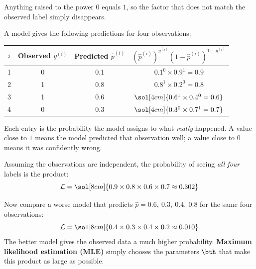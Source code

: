 \documentclass[12pt, a4paper]{article}
\begin{document}
Anything raised to the power $0$ equals $1$, so the factor that does not
match the observed label simply disappears.

\begin{example}
  A model gives the following predictions for four observations:

  \begin{center}
    \renewcommand{\arraystretch}{1.4}
    \begin{tabular}{cccc}
      \toprule
      $i$ & Observed $y^{(i)}$                                                             & Predicted $\hat{p}^{(i)}$
          & $\left(\hat{p}^{(i)}\right)^{y^{(i)}}\left(1-\hat{p}^{(i)}\right)^{1-y^{(i)}}$                                                                         \\
      \midrule
      1   & 0                                                                              & 0.1                       & $0.1^{0} \times 0.9^{1} = 0.9$            \\
      2   & 1                                                                              & 0.8                       & $0.8^{1} \times 0.2^{0} = 0.8$            \\
      3   & 1                                                                              & 0.6                       & $\sol[4cm]{0.6^{1} \times 0.4^{0} = 0.6}$ \\
      4   & 0                                                                              & 0.3                       & $\sol[4cm]{0.3^{0} \times 0.7^{1} = 0.7}$ \\
      \bottomrule
    \end{tabular}
  \end{center}

  Each entry is the probability the model assigns to what \emph{really}
  happened. A value close to $1$ means the model predicted that observation
  well; a value close to $0$ means it was confidently wrong.

  Assuming the observations are independent, the probability of seeing
  \emph{all four} labels is the product:
  \[
    \mathcal{L}
    = \sol[8cm]{0.9 \times 0.8 \times 0.6 \times 0.7 \approx 0.302}
  \]

  Now compare a worse model that predicts $\hat{p} = 0.6,\ 0.3,\ 0.4,\ 0.8$
  for the same four observations:
  \[
    \mathcal{L}
    = \sol[8cm]{0.4 \times 0.3 \times 0.4 \times 0.2 \approx 0.010}
  \]
  The better model gives the observed data a much higher probability.
  \textbf{Maximum likelihood estimation (MLE)} simply chooses the
  parameters $\bth$ that make this product as large as possible.
\end{example}
\end{document}
